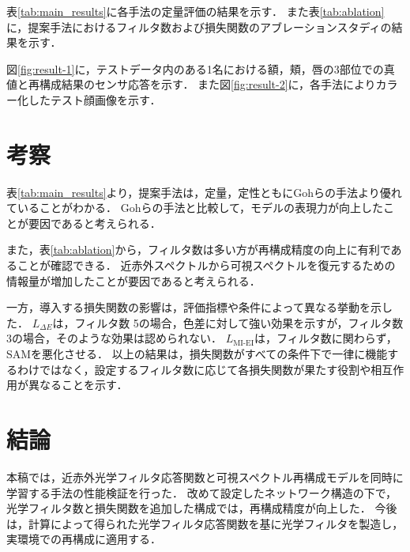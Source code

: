 \documentclass[MIRU,submit]{miru2026j}
\begin{document}
表\ref{tab:main_results}に各手法の定量評価の結果を示す．
また表\ref{tab:ablation}に，提案手法におけるフィルタ数および損失関数のアブレーションスタディの結果を示す．

図\ref{fig:result-1}に，テストデータ内のある1名における額，頬，唇の3部位での真値と再構成結果のセンサ応答を示す．
また図\ref{fig:result-2}に，各手法によりカラー化したテスト顔画像を示す．

\section{考察}
表\ref{tab:main_results}より，提案手法は，定量，定性ともにGohらの手法より優れていることがわかる．
Gohらの手法と比較して，モデルの表現力が向上したことが要因であると考えられる．

また，表\ref{tab:ablation}から，フィルタ数は多い方が再構成精度の向上に有利であることが確認できる．
近赤外スペクトルから可視スペクトルを復元するための情報量が増加したことが要因であると考えられる．

一方，導入する損失関数の影響は，評価指標や条件によって異なる挙動を示した．
$L_{\Delta E}$は，フィルタ数 5の場合，色差に対して強い効果を示すが，フィルタ数 3の場合，そのような効果は認められない．
$L_{\mathrm{MI\text{-}EI}}$は，フィルタ数に関わらず，SAMを悪化させる．
以上の結果は，損失関数がすべての条件下で一律に機能するわけではなく，設定するフィルタ数に応じて各損失関数が果たす役割や相互作用が異なることを示す．

\section{結論}
本稿では，近赤外光学フィルタ応答関数と可視スペクトル再構成モデルを同時に学習する手法の性能検証を行った．
改めて設定したネットワーク構造の下で，光学フィルタ数と損失関数を追加した構成では，再構成精度が向上した．
今後は，計算によって得られた光学フィルタ応答関数を基に光学フィルタを製造し，実環境での再構成に適用する．



\end{document}
